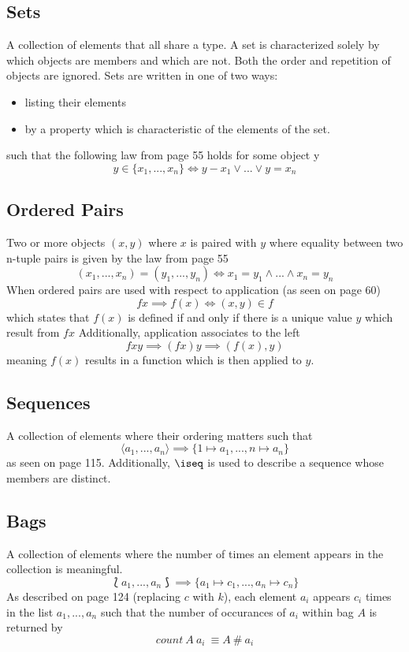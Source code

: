\documentclass[../main.tex]{subfiles}
\begin{document}
\subsection{Sets}
A collection of elements that all share a type. A set is characterized solely by which objects are members and which are not.
Both the order and repetition of objects are ignored. Sets are written in one of two ways:
\begin{itemize}
\item listing their elements
\item by a property which is characteristic of the elements of the set.
\end{itemize}
such that the following law from page 55 holds for some object y
$$y \in \{x_{1},...,x_{n}\} \iff y - x_{1} \lor ... \lor y = x_{n}$$

\subsection{Ordered Pairs}
Two or more objects $(x, y)$ where $x$ is paired with $y$ where equality between two n-tuple pairs is given by the law from page 55
$$(x_{1},...,x_{n}) = (y_{1},...,y_{n}) \iff x_{1} = y_{1} \land ... \land x_{n} = y_{n}$$
When ordered pairs are used with respect to application (as seen on page 60)
$$f x \implies f(x) \iff (x,y) \in f$$
which states that $f(x)$ is defined if and only if there is a unique value $y$ which result from $f x$
Additionally, application associates to the left
$$f x y \implies (f x) y \implies (f(x), y)$$
meaning $f(x)$ results in a function which is then applied to $y$.

\subsection{Sequences}
A collection of elements where their ordering matters such that
$$\langle a_{1},...,a_{n} \rangle \implies \{1 \mapsto a_{1}, ..., n \mapsto a_{n}\}$$
as seen on page 115. Additionally, $\iseq$ is used to describe a sequence whose members are distinct.

\subsection{Bags}
A collection of elements where the number of times an element appears in the collection is meaningful.
$$\lbag a_{1},...,a_{n} \rbag \implies \{a_{1} \mapsto c_{1},...,a_{n} \mapsto c_{n}\}$$
As described on page 124 (replacing $c$ with $k$), each element $a_{i}$ appears $c_{i}$ times in the list $a_{1},...,a_{n}$
such that the number of occurances of $a_{i}$ within bag $A$ is returned by
$$count ~A ~a_{i} \ \equiv A ~\# ~a_{i}$$
\end{document}
